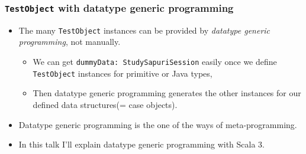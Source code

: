 \begin{frame}[fragile]
\end{frame}

\begin{frame}
  \frametitle{\lstinline|TestObject| with datatype generic programming}

  \begin{itemize}
    \item The many \lstinline|TestObject| instances can be provided by
    \emph{datatype generic programming}, not manually.
    \begin{itemize}
      \item We can get \lstinline|dummyData: StudySapuriSession| easily once we define
      \lstinline|TestObject| instances for primitive or Java types,
      \item Then datatype generic programming generates the other instances for our
      defined data structures(= case objects).
    \end{itemize}

    \item Datatype generic programming is the one of the ways of meta-programming.

    \item In this talk I'll explain datatype generic programming with Scala 3.
  \end{itemize}

\end{frame}

